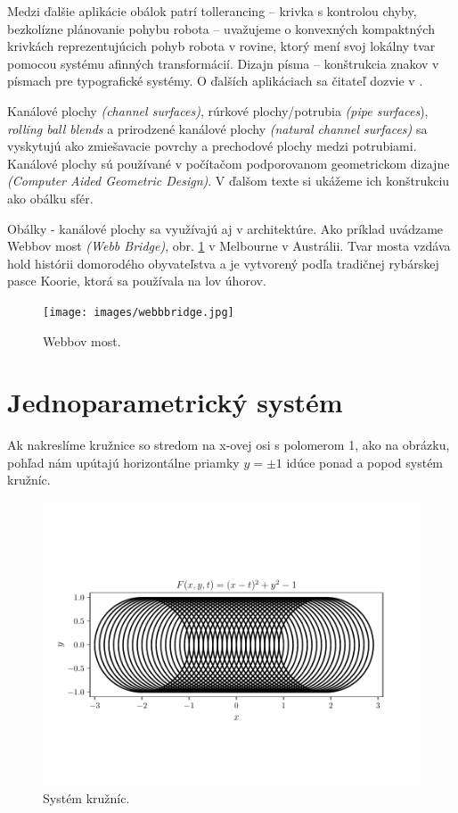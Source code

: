Medzi ďalšie aplikácie obálok patrí tollerancing – krivka s kontrolou chyby, bezkolízne plánovanie pohybu robota – uvažujeme o konvexných kompaktných krivkách reprezentujúcich pohyb robota v rovine, ktorý mení svoj lokálny tvar pomocou systému afinných transformácií. Dizajn písma – konštrukcia znakov v písmach pre typografické systémy. O ďalších aplikáciach sa čitateľ dozvie v \cite{Pott09}.

Kanálové plochy \textit{(channel surfaces)}, rúrkové plochy/potrubia \textit{(pipe surfaces}), \textit{rolling ball blends} a prirodzené kanálové plochy \textit{(natural channel surfaces)} sa vyskytujú ako zmiešavacie povrchy a prechodové plochy medzi potrubiami. Kanálové plochy sú používané v počítačom podporovanom geometrickom dizajne \textit{(Computer Aided Geometric Design)}. V ďalšom texte si ukážeme ich konštrukciu ako obálku sfér.

Obálky - kanálové plochy sa využívajú aj v architektúre. Ako príklad uvádzame Webbov most \textit{(Webb Bridge)}, obr. \ref{fig:webb_bridge} v Melbourne v Austrálii. Tvar mosta vzdáva hold histórii domorodého obyvateľstva a je vytvorený podľa tradičnej rybárskej pasce Koorie, ktorá sa používala na lov úhorov.

\begin{figure}[h!]
	\centering
	\texttt{[image: images/webbbridge.jpg]}
	\caption[Webbov most.]{Webbov most. \cite{WebbBridge}}
	\label{fig:webb_bridge}
\end{figure}

\section{Jednoparametrický systém}
Ak nakreslíme kružnice so stredom na x-ovej osi s polomerom 1, ako na obrázku, pohľad nám upútajú horizontálne priamky $y = \pm 1$ idúce ponad a popod systém kružníc.

\begin{figure}[h]
	\centering
	\includegraphics[trim={0 1.65cm 0 2cm},clip]{images/system.pdf}
	\caption[Systém kružníc.]{Systém kružníc.}
	\label{fig:system}
\end{figure}

